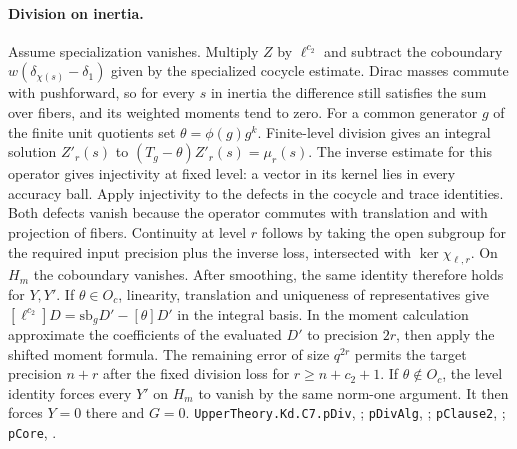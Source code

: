\paragraph{Division on inertia.}
Assume specialization vanishes. Multiply $Z$ by $\ell^{c_2}$ and subtract
the coboundary $w(\delta_{\chi(s)}-\delta_1)$ given by the specialized
cocycle estimate. Dirac masses commute with pushforward, so for every $s$ in inertia the difference
still satisfies the sum over fibers, and its weighted moments tend to zero.
For a common generator $g$ of the finite unit quotients set
$\theta=\phi(g)g^k$. Finite-level division gives an integral solution
$Z'_r(s)$ to $(T_g-\theta)Z'_r(s)=\mu_r(s)$.
The inverse estimate for this operator gives injectivity at fixed level:
a vector in its kernel lies in every accuracy ball. Apply injectivity to
the defects in the cocycle and trace identities. Both defects vanish
because the operator commutes with translation and with projection of
fibers. Continuity at level $r$ follows by taking the open subgroup for
the required input precision plus the inverse loss, intersected with
$\ker\chi_{\ell,r}$. On $H_m$ the coboundary vanishes. After smoothing,
the same identity therefore holds for $Y,Y'$. If $\theta\in O_c$, linearity,
translation and uniqueness of representatives give
$[\ell^{c_2}]D=\mathrm{sb}_gD'-[\theta]D'$ in the integral basis.
In the moment calculation approximate the coefficients of the evaluated
$D'$ to precision $2r$, then apply the shifted moment formula. The remaining
error of size $q^{2r}$ permits the target precision $n+r$ after the fixed
division loss for $r\ge n+c_2+1$. If $\theta\notin O_c$, the level identity
forces every $Y'$ on $H_m$ to vanish by the same norm-one argument. It
then forces $Y=0$ there and $G=0$.
{\footnotesize\nolinkurl{UpperTheory.Kd.C7.pDiv},
;
\nolinkurl{pDivAlg}, ;
\nolinkurl{pClause2}, ;
\nolinkurl{pCore}, .}

